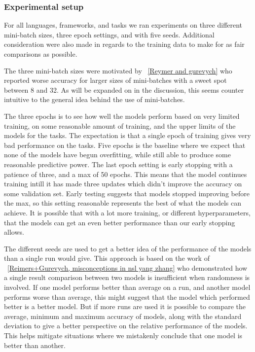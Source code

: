 \subsubsection{Experimental setup}

For all languages, frameworks, and tasks we ran experiments on three different
mini-batch sizes, three epoch settings, and with five seeds. Additional
consideration were also made in regards to the training data to make for as fair
comparisons as possible.

The three mini-batch sizes were motivated by ~\ref{Reymer and gurevych} who
reported worse accuracy for larger sizes of mini-batches with a sweet spot
between 8 and 32. As will be expanded on in the discussion, this seems counter
intuitive to the general idea behind the use of mini-batches. %

The three epochs is to see how well the models perform based on very limited
training, on some reasonable amount of training, and the upper limits of the
models for the tasks. The expectation is that a single epoch of training gives
very bad performance on the tasks. Five epochs is the baseline where we expect
that none of the models have begun overfitting, while still able to produce some
reasonable predictive power. The last epoch setting is early stopping with a
patience of three, and a max of 50 epochs. This means that the model continues
training intill it has made three updates which didn't improve the accuracy on
some validation set. Early testing suggests that models stopped improving before
the max, so this setting reasonable represents the best of what the models can
achieve. It is possible that with a lot more training, or different
hyperparameters, that the models can get an even better performance than our
early stopping allows.

The different seeds are used to get a better idea of the performance of the
models than a single run would give. This approach is based on the work of
~\ref{Reimers+Gurevych, misconceptions in nsl yang zhang} who demonstrated how a
single result comparison between two models is insufficient when randomness is
involved. If one model performs better than average on a run, and another model
performs worse than average, this might suggest that the model which performed
better is a better model. But if more runs are used it is possible to compare
the average, minimum and maximum accuracy of models, along with the standard
deviation to give a better perspective on the relative performance of the
models. This helps mitigate situations where we mistakenly conclude that one
model is better than another.

